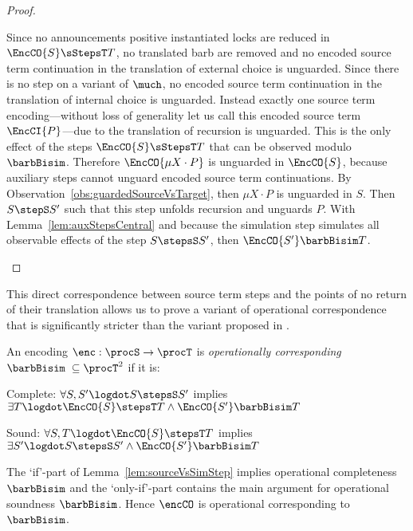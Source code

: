 \documentclass[]{eptcs}
\begin{document}
\begin{proof}
\begin{compactitem}
\begin{compactenum}
				\item Since no announcements \wrt positive instantiated locks are reduced in $ \EncCO{S} \sStepsT T $, no translated barb are removed and no encoded source term continuation in the translation of external choice is unguarded. Since there is no step on a variant of $ \much $, no encoded source term continuation in the translation of internal choice is unguarded. Instead exactly one source term encoding---without loss of generality let us call this encoded source term $ \EncCI{P} $---due to the translation of recursion is unguarded. This is the only effect of the steps $ \EncCO{S} \sStepsT T $ that can be observed modulo $ \barbBisim $. Therefore $ \EncCO{\mu X \cdot P} $ is unguarded in $ \EncCO{S} $, because auxiliary steps cannot unguard encoded source term continuations. By Observation~\ref{obs:guardedSourceVsTarget}, then $ \mu X \cdot P $ is unguarded in $ S $. Then $ S \stepS S' $ such that this step unfolds recursion and unguards $ P $. With Lemma~\ref{lem:auxStepsCentral} and because the simulation step simulates all observable effects of the step $ S \stepsS S' $, then $ \EncCO{S'} \barbBisim T $.
			\end{compactenum}
	\end{compactitem}
\end{proof}

\noindent
This direct correspondence between source term steps and the points of no return of their translation allows us to prove a variant of operational correspondence that is significantly stricter than the variant proposed in \cite{gorla10}.

\begin{definition}
	$ $\\
	An encoding $ \enc: \procS \to \procT $ is \emph{operationally corresponding} \wrt $ \barbBisim \; \subseteq \procT^2 $ if it is:
	\begin{compactitem}
		\item[\; Complete:] $ \forall S, S' \logdot S \stepsS S' $ implies $ \exists T \logdot \EncCO{S} \stepsT T \wedge \EncCO{S'} \barbBisim T $
		\item[\; Sound:] $ \forall S, T \logdot \EncCO{S} \stepsT T $ implies $ \exists S' \logdot S \stepsS S' \wedge \EncCO{S'} \barbBisim T $
	\end{compactitem}
\end{definition}

\noindent
The `if'-part of Lemma~\ref{lem:sourceVsSimStep} implies operational completeness \wrt $ \barbBisim $ and the `only-if'-part contains the main argument for operational soundness \wrt $ \barbBisim $. Hence $ \encCO $ is operational corresponding \wrt to $ \barbBisim $.
\end{document}
